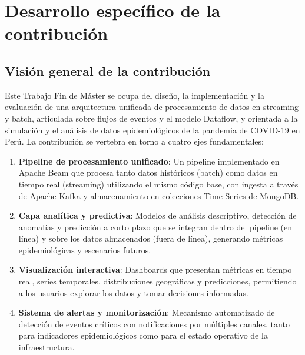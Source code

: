 \documentclass[12pt,a4paper]{article}
\begin{document}
\clearpage
\section{Desarrollo específico de la contribución}\label{desarrollo-especuxedfico-de-la-contribuciuxf3n}

\subsection{\texorpdfstring{Visión general de la contribución}{Visión general de la contribución}}\label{visiuxf3n-general-de-la-contribuciuxf3n}

Este Trabajo Fin de Máster se ocupa del diseño, la implementación y la evaluación de una arquitectura unificada de procesamiento de datos en streaming y batch, articulada sobre flujos de eventos y el modelo Dataflow, y orientada a la simulación y el análisis de datos epidemiológicos de la pandemia de COVID-19 en Perú. La contribución se vertebra en torno a cuatro ejes fundamentales:


\begin{enumerate}
    \item \textbf{Pipeline de procesamiento unificado}: Un pipeline implementado en Apache Beam que procesa tanto datos históricos (batch) como datos en tiempo real (streaming) utilizando el mismo código base, con ingesta a través de Apache Kafka y almacenamiento en colecciones Time-Series de MongoDB.
    \item \textbf{Capa analítica y predictiva}: Modelos de análisis descriptivo, detección de anomalías y predicción a corto plazo que se integran dentro del pipeline (en línea) y sobre los datos almacenados (fuera de línea), generando métricas epidemiológicas y escenarios futuros.
    \item \textbf{Visualización interactiva}: Dashboards que presentan métricas en tiempo real, series temporales, distribuciones geográficas y predicciones, permitiendo a los usuarios explorar los datos y tomar decisiones informadas.
    \item \textbf{Sistema de alertas y monitorización}: Mecanismo automatizado de detección de eventos críticos con notificaciones por múltiples canales, tanto para indicadores epidemiológicos como para el estado operativo de la infraestructura.
\end{enumerate}
\end{document}
